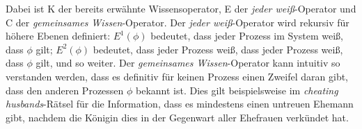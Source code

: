 Dabei ist K der bereits erwähnte Wissensoperator, E der \textit{jeder weiß}-Operator und C der \textit{gemeinsames Wissen}-Operator.
Der \textit{jeder weiß}-Operator wird rekursiv für höhere Ebenen definiert: $E^1(\phi)$ bedeutet, dass jeder Prozess im System weiß, dass $\phi$ gilt; $E^2(\phi)$ bedeutet, dass jeder Prozess weiß, dass jeder Prozess weiß, dass $\phi$ gilt, und so weiter.
Der \textit{gemeinsames Wissen}-Operator kann intuitiv so verstanden werden, dass es definitiv für keinen Prozess einen Zweifel daran gibt, dass den anderen Prozessen $\phi$ bekannt ist. Dies gilt beispielsweise im \textit{cheating husbands}-Rätsel für die Information, dass es mindestens einen untreuen Ehemann gibt, nachdem die Königin dies in der Gegenwart aller Ehefrauen verkündet hat. 